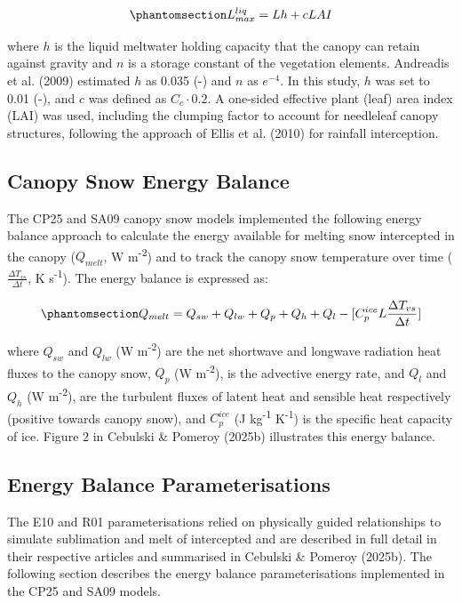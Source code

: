 \documentclass[
]{agujournal2019}
\begin{document}
\begin{equation}\phantomsection\label{eq-liq-hold-cap}{
L_{max}^{liq} = Lh + cLAI
}\end{equation}

where \(h\) is the liquid meltwater holding capacity that the canopy can
retain against gravity and \(n\) is a storage constant of the vegetation
elements. Andreadis et al. (2009) estimated \(h\) as 0.035 (-) and \(n\)
as \(e^{-4}\). In this study, \(h\) was set to 0.01 (-), and \(c\) was
defined as \(C_c\cdot 0.2\). A one-sided effective plant (leaf) area
index (LAI) was used, including the clumping factor to account for
needleleaf canopy structures, following the approach of Ellis et al.
(2010) for rainfall interception.

\subsection{Canopy Snow Energy Balance}\label{sec-ebal}

The CP25 and SA09 canopy snow models implemented the following energy
balance approach to calculate the energy available for melting snow
intercepted in the canopy (\(Q_{melt}\), W m\textsuperscript{-2}) and to
track the canopy snow temperature over time
(\(\frac{\Delta T_{vs}}{\Delta t}\), K s\textsuperscript{-1}). The
energy balance is expressed as:

\begin{equation}\phantomsection\label{eq-eb}{
Q_{melt} = 
Q_{sw} +
Q_{lw} +
Q_{p} + Q_{h} + Q_{l} - [C_p^{ice} L \frac{\Delta T_{vs}}{\Delta t}]
}\end{equation}

where \(Q_{sw}\) and \(Q_{lw}\) (W m\textsuperscript{-2}) are the net
shortwave and longwave radiation heat fluxes to the canopy snow, \(Q_p\)
(W m\textsuperscript{-2}), is the advective energy rate, and \(Q_{l}\)
and \(Q_{h}\) (W m\textsuperscript{-2}), are the turbulent fluxes of
latent heat and sensible heat respectively (positive towards canopy
snow), and \(C_p^{ice}\) (J kg\textsuperscript{-1}
K\textsuperscript{-1}) is the specific heat capacity of ice. Figure 2 in
Cebulski \& Pomeroy (2025b) illustrates this energy balance.

\subsection{Energy Balance
Parameterisations}\label{energy-balance-parameterisations}

The E10 and R01 parameterisations relied on physically guided
relationships to simulate sublimation and melt of intercepted and are
described in full detail in their respective articles and summarised in
Cebulski \& Pomeroy (2025b). The following section describes the energy
balance parameterisations implemented in the CP25 and SA09 models.
\end{document}
